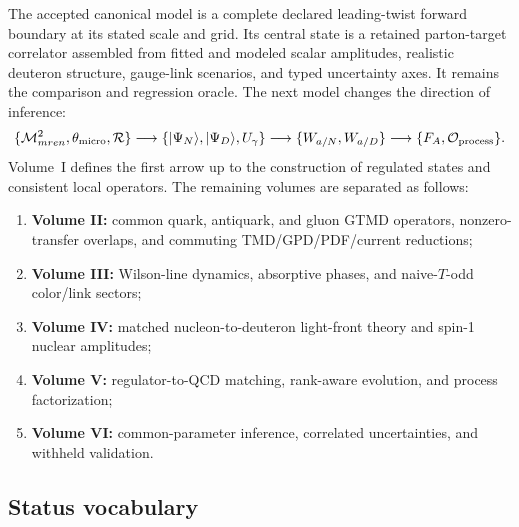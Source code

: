 \documentclass[11pt]{article}
\newcommand{\cO}{\mathcal O}
\newcommand{\cM}{\mathcal M}
\newcommand{\cR}{\mathcal R}
\begin{document}
The accepted canonical model is a complete declared leading-twist forward
boundary at its stated scale and grid.  Its central state is a retained
parton-target correlator assembled from fitted and modeled scalar amplitudes,
realistic deuteron structure, gauge-link scenarios, and typed uncertainty
axes.  It remains the comparison and regression oracle.  The next model
changes the direction of inference:
\begin{equation}
\{\cM_{
m ren}^2,\theta_{\rm micro},\cR\}
\longrightarrow
\{|\Psi_N\rangle,|\Psi_D\rangle,U_\gamma\}
\longrightarrow
\{W_{a/N},W_{a/D}\}
\longrightarrow
\{F_A,\cO_{\rm process}\}.
\label{eq:generative-chain-volume1}
\end{equation}
Volume~I defines the first arrow up to the construction of regulated states
and consistent local operators.  The remaining volumes are separated as
follows:
\begin{enumerate}
\item \textbf{Volume II:} common quark, antiquark, and gluon GTMD operators,
nonzero-transfer overlaps, and commuting TMD/GPD/PDF/current reductions;
\item \textbf{Volume III:} Wilson-line dynamics, absorptive phases, and
naive-\(T\)-odd color/link sectors;
\item \textbf{Volume IV:} matched nucleon-to-deuteron light-front theory and
spin-1 nuclear amplitudes;
\item \textbf{Volume V:} regulator-to-QCD matching, rank-aware evolution,
and process factorization;
\item \textbf{Volume VI:} common-parameter inference, correlated
uncertainties, and withheld validation.
\end{enumerate}

\subsection{Status vocabulary}
\end{document}
